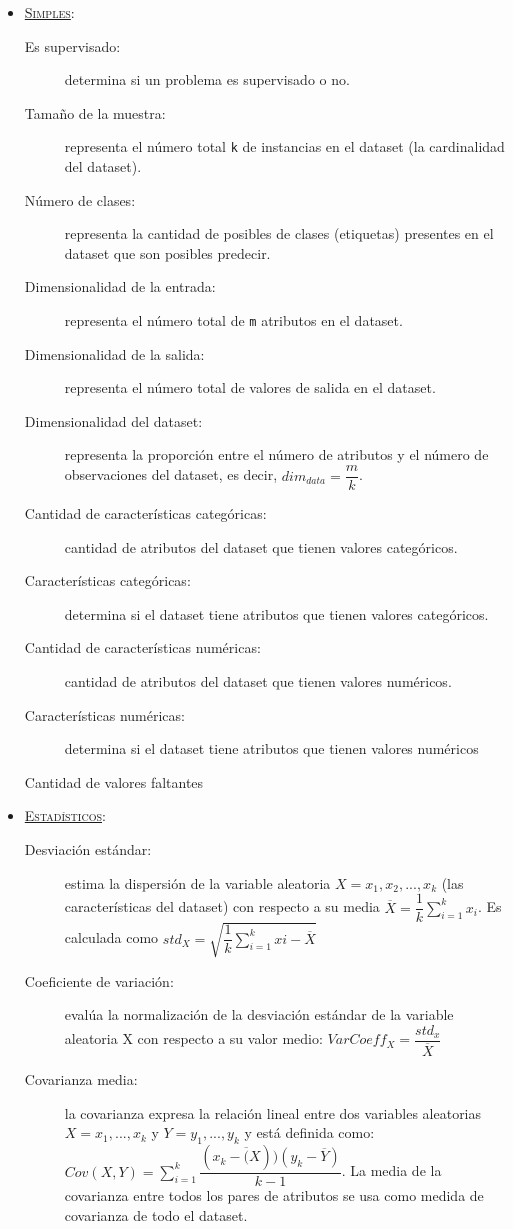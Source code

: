 \begin{itemize}
	\item \underline{\textsc{Simples}}: \begin{description}
		\item[Es supervisado:] determina si un problema es supervisado o no.
		\item[Tamaño de la muestra:] representa el número total \texttt{k} de instancias en el dataset (la cardinalidad del dataset).
		\item[Número de clases:] representa la cantidad de posibles de clases (etiquetas) presentes en el dataset que son posibles predecir.
		\item[Dimensionalidad de la entrada:] representa el número total de \texttt{m} atributos en el dataset.
		\item[Dimensionalidad de la salida:] representa el número total de valores de salida en el dataset.
		\item[Dimensionalidad del dataset:] representa la proporción entre el número de atributos y el número de observaciones del dataset, es decir, $dim_{data} = \dfrac{m}{k}$.
		\item[Cantidad de características categóricas:] cantidad de atributos del dataset que tienen valores categóricos.
		\item[Características categóricas:] determina si el dataset tiene atributos que tienen valores categóricos.
		\item[Cantidad de características numéricas:] cantidad de atributos del dataset que tienen valores numéricos.
		\item[Características numéricas:] determina si el dataset tiene atributos que tienen valores numéricos
		\item[Cantidad de valores faltantes]
	\end{description}
	\item \underline{\textsc{Estadísticos}}: \begin{description}
		\item[Desviación estándar:] estima la dispersión de la variable aleatoria $X = x_1, x_2, ..., x_k$ (las características del dataset) con respecto a su media $\overline{X} = \dfrac{1}{k}\sum^k_{i=1}x_i$. Es calculada como $std_X = \sqrt{\dfrac{1}{k}\sum^k_{i=1}xi - \overline{X}}$
		\item[Coeficiente de variación:] evalúa la normalización de la desviación estándar de la variable aleatoria X con respecto a su valor medio: $VarCoeff_X =  \dfrac{std_x}{\overline{X}}$
		\item[Covarianza media:] la covarianza expresa la relación lineal entre dos variables aleatorias $X = x_1, ..., x_k$ y $Y = y_1, ..., y_k$ y está definida como: $Cov(X, Y) = \sum^k_{i=1} \dfrac{(x_k - \overline(X))(y_k - \overline{Y})}{k-1}$. La media de la covarianza entre todos los pares de atributos se usa como medida de covarianza de todo el dataset.

\end{description}
\end{itemize}
